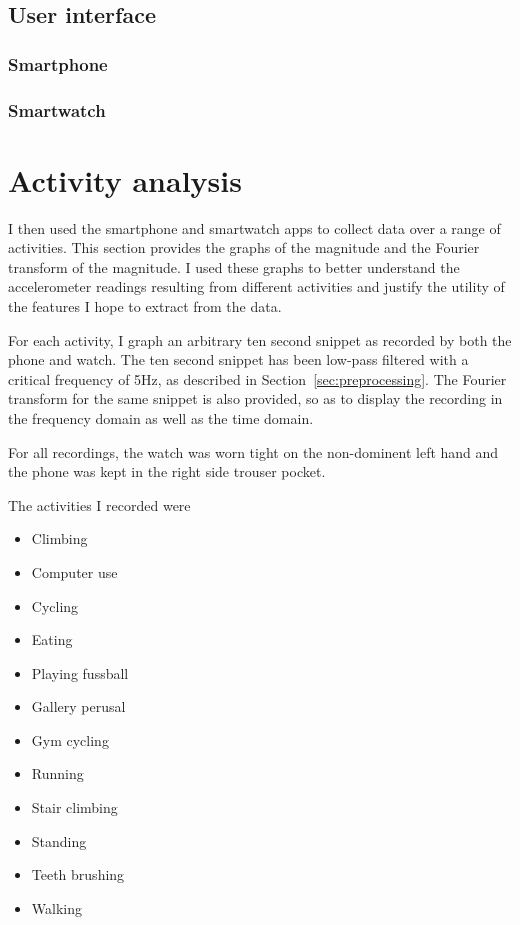     \subsection{User interface}
      \subsubsection{Smartphone}
      
      \subsubsection{Smartwatch}
      
  \section{Activity analysis}
    \label{sec:activity-details}
    I then used the smartphone and smartwatch apps to collect data over a range of activities. This section provides the graphs of the magnitude and the Fourier transform of the magnitude. I used these graphs to better understand the accelerometer readings resulting from different activities and justify the utility of the features I hope to extract from the data.
    
    For each activity, I graph an arbitrary ten second snippet as recorded by both the phone and watch. The ten second snippet has been low-pass filtered with a critical frequency of 5Hz, as described in Section~\ref{sec:preprocessing}. The Fourier transform for the same snippet is also provided, so as to display the recording in the frequency domain as well as the time domain.
    
    For all recordings, the watch was worn tight on the non-dominent left hand and the phone was kept in the right side trouser pocket.
    
    The activities I recorded were
    \begin{itemize}
      \item Climbing
      \item Computer use
      \item Cycling
      \item Eating
      \item Playing fussball
      \item Gallery perusal
      \item Gym cycling
      \item Running
      \item Stair climbing
      \item Standing
      \item Teeth brushing
      \item Walking
    \end{itemize}

